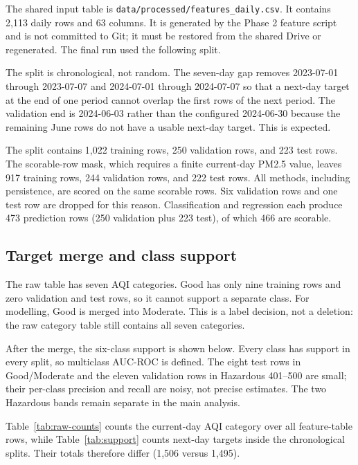 \documentclass[11pt]{article}
\begin{document}
The shared input table is \texttt{data/processed/features\_daily.csv}. It contains 2,113 daily rows and 63 columns. It is generated by the Phase 2 feature script and is not committed to Git; it must be restored from the shared Drive or regenerated. The final run used the following split.



The split is chronological, not random. The seven-day gap removes 2023-07-01 through 2023-07-07 and 2024-07-01 through 2024-07-07 so that a next-day target at the end of one period cannot overlap the first rows of the next period. The validation end is 2024-06-03 rather than the configured 2024-06-30 because the remaining June rows do not have a usable next-day target. This is expected.

The split contains 1,022 training rows, 250 validation rows, and 223 test rows. The scorable-row mask, which requires a finite current-day PM2.5 value, leaves 917 training rows, 244 validation rows, and 222 test rows. All methods, including persistence, are scored on the same scorable rows. Six validation rows and one test row are dropped for this reason. Classification and regression each produce 473 prediction rows (250 validation plus 223 test), of which 466 are scorable.

\subsection{Target merge and class support}

The raw table has seven AQI categories. Good has only nine training rows and zero validation and test rows, so it cannot support a separate class. For modelling, Good is merged into Moderate. This is a label decision, not a deletion: the raw category table still contains all seven categories.



After the merge, the six-class support is shown below. Every class has support in every split, so multiclass AUC-ROC is defined. The eight test rows in Good/Moderate and the eleven validation rows in Hazardous 401--500 are small; their per-class precision and recall are noisy, not precise estimates. The two Hazardous bands remain separate in the main analysis.



Table~\ref{tab:raw-counts} counts the current-day AQI category over all feature-table rows, while Table~\ref{tab:support} counts next-day targets inside the chronological splits. Their totals therefore differ (1,506 versus 1,495).
\end{document}

